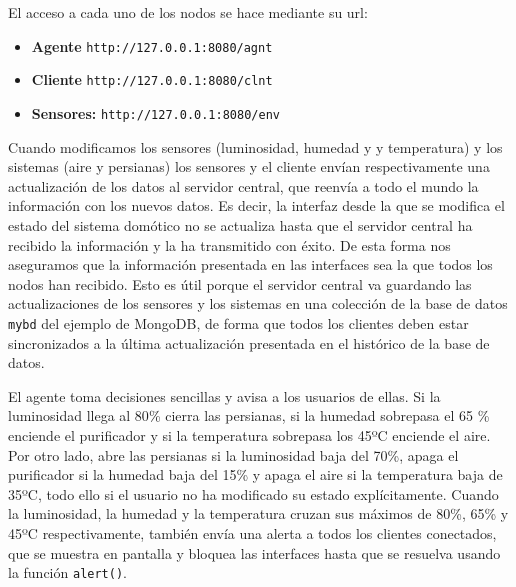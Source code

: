 El acceso a cada uno de los nodos se hace mediante su url:

\begin{itemize}
	\item\textbf{Agente}
		\texttt{http://127.0.0.1:8080/agnt}
	\item\textbf{Cliente}
		\texttt{http://127.0.0.1:8080/clnt}
	\item\textbf{Sensores:}
		\texttt{http://127.0.0.1:8080/env}
\end{itemize}

Cuando modificamos los sensores (luminosidad, humedad y y temperatura) y los sistemas (aire y persianas) los sensores y el cliente envían respectivamente una actualización de los datos al servidor central, que reenvía a todo el mundo la información con los nuevos datos.
Es decir, la interfaz desde la que se modifica el estado del sistema domótico no se actualiza hasta que el servidor central ha recibido la información y la ha transmitido con éxito.
De esta forma nos aseguramos que la información presentada en las interfaces sea la que todos los nodos han recibido.
Esto es útil porque el servidor central va guardando las actualizaciones de los sensores y los sistemas en una colección de la base de datos \texttt{mybd} del ejemplo de MongoDB, de forma que todos los clientes deben estar sincronizados a la última actualización presentada en el histórico de la base de datos.

El agente toma decisiones sencillas y avisa a los usuarios de ellas.
Si la luminosidad llega al 80{\%} cierra las persianas, si la humedad sobrepasa el 65 {\%} enciende el purificador y si la temperatura sobrepasa los 45ºC enciende el aire.
Por otro lado, abre las persianas si la luminosidad baja del 70{\%}, apaga el purificador si la humedad baja del 15{\%} y apaga el aire si la temperatura baja de 35ºC, todo ello si el usuario no ha modificado su estado explícitamente.
Cuando la luminosidad, la humedad y la temperatura cruzan sus máximos de 80{\%}, 65{\%} y 45ºC respectivamente, también envía una alerta a todos los clientes conectados, que se muestra en pantalla y bloquea las interfaces hasta que se resuelva usando la función \texttt{alert()}.
